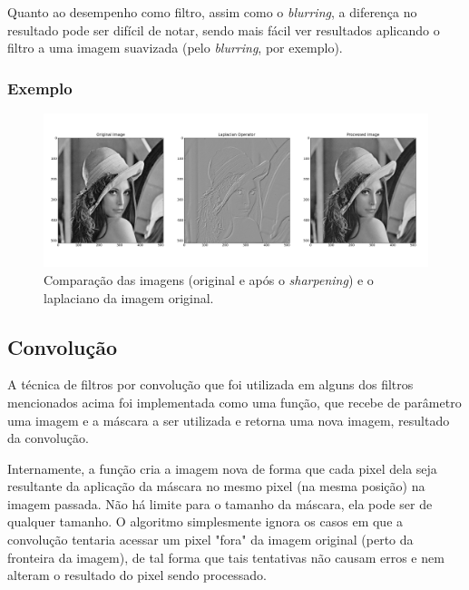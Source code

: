 Quanto ao desempenho como filtro, assim como o \textit{blurring}, a diferença no resultado pode ser difícil de notar,
sendo mais fácil ver resultados aplicando o filtro a uma imagem suavizada (pelo \textit{blurring}, por exemplo).

\subsubsection{Exemplo}
\begin{figure}[htb]
    \centering
    \includegraphics[width=1.0\textwidth]{sharpen_example.png}
    \caption{Comparação das imagens (original e após o \textit{sharpening}) e o laplaciano da imagem original.}
    \label{fig:ex_sharpen}
\end{figure}

\subsection{Convolução}
A técnica de filtros por convolução que foi utilizada em alguns dos filtros mencionados acima foi implementada como uma
função, que recebe de parâmetro uma imagem e a máscara a ser utilizada e retorna uma nova imagem, resultado da convolução.

Internamente, a função cria a imagem nova de forma que cada pixel dela seja resultante da aplicação da máscara no mesmo
pixel (na mesma posição) na imagem passada. Não há limite para o tamanho da máscara, ela pode ser de qualquer tamanho.
O algoritmo simplesmente ignora os casos em que a convolução tentaria acessar um pixel "fora" da imagem original (perto
da fronteira da imagem), de tal forma que tais tentativas não causam erros e nem alteram o resultado do pixel sendo processado.

